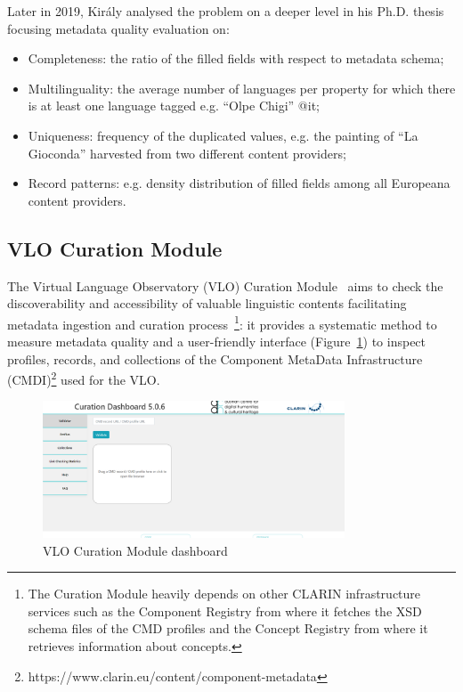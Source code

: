 \documentclass[epsfig,a4paper,12pt,titlepage]{book}
\begin{document}
Later in 2019, Kir{\'a}ly analysed the problem on a deeper level in his Ph.D. thesis focusing metadata quality evaluation on:
\begin{itemize}
    \item Completeness: the ratio of the filled fields with respect to metadata schema;
    \item Multilinguality: the average number of languages per property for which there is at least one language tagged e.g. ``Olpe Chigi'' @it;
    \item Uniqueness: frequency of the duplicated values, e.g. the painting of ``La Gioconda'' harvested from two different content providers;
    \item Record patterns: e.g.  density distribution of filled fields among all Europeana content providers.
\end{itemize}
\subsection{VLO Curation Module}
\label{subsub:vlo}
The Virtual Language Observatory (VLO) Curation Module~\cite{Ostojic2017} aims to check the discoverability and accessibility of valuable linguistic contents facilitating metadata ingestion and curation process~\cite{6}\footnote{The Curation Module heavily depends on other CLARIN infrastructure services such as the Component Registry from where it fetches the XSD schema files of the CMD profiles and the Concept Registry from where it retrieves information about concepts.}: it provides a systematic method to measure metadata quality and a user-friendly interface (Figure~\ref{fig:vlo_land}) to inspect profiles, records, and collections of the Component MetaData Infrastructure  (CMDI)\footnote{https://www.clarin.eu/content/component-metadata} used for the VLO.	\begin{figure}[h]
		\center 
		\includegraphics[width=0.8\textwidth]{screencapture-curation-clarin-eu-2021-06-26-15_11_41.png}
		\caption{VLO Curation Module dashboard}
		\label{fig:vlo_land}       %
	\end{figure}
	
\end{document}
